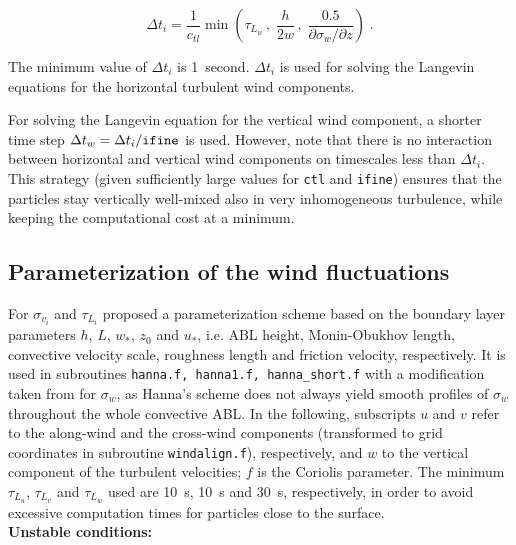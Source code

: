 \documentclass{egu}            %
\begin{document}
\begin{equation}
\Delta t_i=\frac{1}{c_{tl}} \min \left ({\tau_{L_w}\, , \; \frac{h}{2w}\, , \; \frac{0.5}{\partial \sigma_w / \partial z}} \right ) \;.
\end{equation}

The minimum value of $\Delta t_i$ is 1~second.
$\Delta t_i$ is used for solving the Langevin equations for the horizontal turbulent wind components.

For solving the Langevin equation for the vertical wind component, a shorter
time step $\Delta t_w=\Delta t_i / \verb|ifine|$ is used.  However, note that
there is no interaction between horizontal and vertical wind components on
timescales less than $\Delta t_i$.  This strategy (given sufficiently large
values for \verb|ctl| and \verb|ifine|) ensures that the particles stay
vertically well-mixed also in very inhomogeneous turbulence, while keeping the
computational cost at a minimum.

\subsection{Parameterization of the wind fluctuations}

For $\sigma_{v_i}$ and $\tau_{L_i}$ \citet{hanna1982} proposed a
parameterization scheme based on the boundary layer parameters $h$, $L$, $w_*$,
$z_0$ and $u_*$, i.e.  ABL height, Monin-Obukhov length, convective velocity
scale, roughness length and friction velocity, respectively.  It is used in
subroutines \verb|hanna.f, hanna1.f, hanna_short.f| with a modification taken
from \citet{ryall1997} for $\sigma_w$, as Hanna's scheme does not always yield
smooth profiles of $\sigma_w$ throughout the whole convective ABL.  In the
following, subscripts $u$ and $v$ refer to the along-wind and the cross-wind
components (transformed to grid coordinates in subroutine \verb|windalign.f|),
respectively, and $w$ to the vertical component of the turbulent velocities;
$f$ is the Coriolis parameter.  The minimum $\tau_{L_u}$, $\tau_{L_v}$ and
$\tau_{L_w}$ used are 10~s, 10~s and 30~s, respectively, in order to avoid
excessive computation times for particles close to the surface.\\[0.3cm]

{\bf Unstable conditions:}
\end{document}
